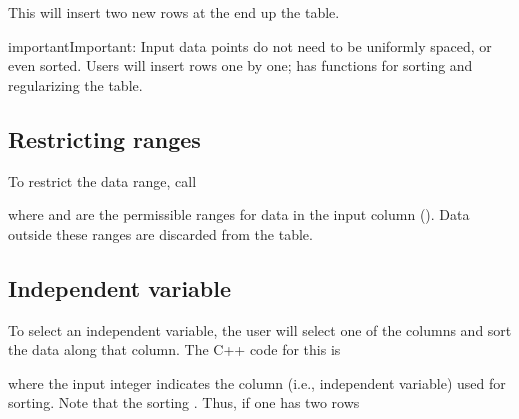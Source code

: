 \documentclass[letterpaper,10pt,english]{sphinxmanual}
\begin{document}
This will insert two new rows at the end up the table.

\begin{sphinxadmonition}{important}{Important:}
Input data points do not need to be uniformly spaced, or even sorted.
Users will insert rows one by one;  has functions for sorting and regularizing the table.
\end{sphinxadmonition}


\subsection{Restricting ranges}
\label{\detokenize{Utilities/LookupTable:restricting-ranges}}
To restrict the data range, call

\begin{sphinxVerbatim}[commandchars=\\\{\},formatcom=\scriptsize]
         
\end{sphinxVerbatim}

where  and  are the permissible ranges for data in the input column ().
Data outside these ranges are discarded from the table.


\subsection{Independent variable}
\label{\detokenize{Utilities/LookupTable:independent-variable}}
To select an independent variable, the user will select one of the columns and sort the data along that column.
The C++ code for this is

\begin{sphinxVerbatim}[commandchars=\\\{\},formatcom=\scriptsize]
  
   
\end{sphinxVerbatim}

where the input integer indicates the column (i.e., independent variable) used for sorting.
Note that the sorting .
Thus, if one has two rows
\end{document}
